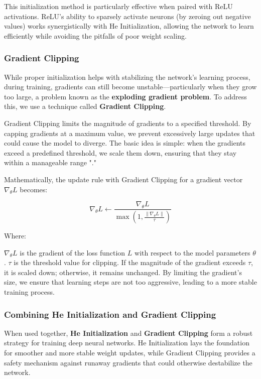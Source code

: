 This initialization method is particularly effective when paired with ReLU activations. ReLU's ability to sparsely activate neurons (by zeroing out negative values) works synergistically with He Initialization, allowing the network to learn efficiently while avoiding the pitfalls of poor weight scaling.

\subsubsection*{Gradient Clipping}

While proper initialization helps with stabilizing the network’s learning process, during training, gradients can still become unstable—particularly when they grow too large, a problem known as the \textbf{exploding gradient problem}. To address this, we use a technique called \textbf{Gradient Clipping}.

Gradient Clipping limits the magnitude of gradients to a specified threshold. By capping gradients at a maximum value, we prevent excessively large updates that could cause the model to diverge. The basic idea is simple: when the gradients exceed a predefined threshold, we scale them down, ensuring that they stay within a manageable range "\cite{zhang2020gradientclippingacceleratestraining}."

Mathematically, the update rule with Gradient Clipping for a gradient vector $\nabla_{\theta} L$ becomes:

\[\nabla_{\theta} L \leftarrow \frac{\nabla_{\theta} L}{\max (1, \frac{\|\nabla_{\theta} L\|}{\tau})}\]
 
Where:

$\nabla_{\theta} L$ is the gradient of the loss function $L$ with respect to the model parameters $\theta$.
$\tau$ is the threshold value for clipping.
If the magnitude of the gradient exceeds $\tau$, it is scaled down; otherwise, it remains unchanged. By limiting the gradient's size, we ensure that learning steps are not too aggressive, leading to a more stable training process.

\subsubsection*{Combining He Initialization and Gradient Clipping}

When used together, \textbf{He Initialization} and \textbf{Gradient Clipping} form a robust strategy for training deep neural networks. He Initialization lays the foundation for smoother and more stable weight updates, while Gradient Clipping provides a safety mechanism against runaway gradients that could otherwise destabilize the network.

